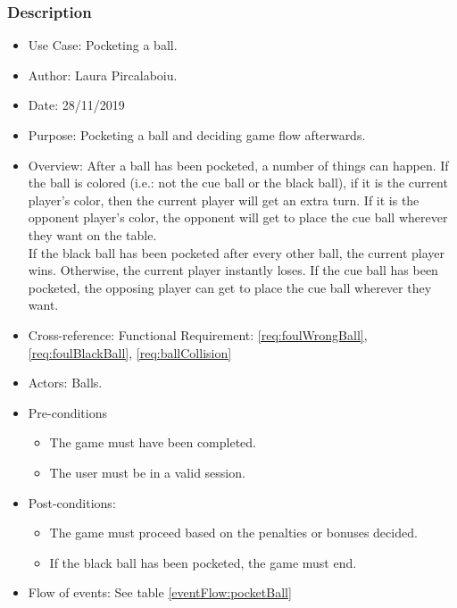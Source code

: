 \documentclass[10pt]{article}
\begin{document}
	\subsubsection{Description}
		\begin{itemize}
			\item{Use Case:} Pocketing a ball.
			\item{Author:} Laura Pircalaboiu.
			\item{Date:} 28/11/2019
			\item{Purpose:} Pocketing a ball and deciding game flow afterwards.
			\item{Overview:} After a ball has been pocketed, a number of things can happen. If the ball is colored (i.e.: not the cue ball or the black ball), if it is the current player's color, then the current player will get an extra turn. If it is the opponent player's color, the opponent will get to place the cue ball wherever they want on the table.\\
			If the black ball has been pocketed after every other ball, the current player wins. Otherwise, the current player instantly loses.
			If the cue ball has been pocketed, the opposing player can get to place the cue ball wherever they want.
			\item{Cross-reference:} Functional Requirement: \ref{req:foulWrongBall}, \ref{req:foulBlackBall}, \ref{req:ballCollision}
			\item{Actors:} Balls.
			\item{Pre-conditions} 
				\begin{itemize}
					\item The game must have been completed.
					\item The user must be in a valid session.
				\end{itemize}
			\item{Post-conditions:}
				\begin{itemize}
					\item The game must proceed based on the penalties or bonuses decided.
					\item If the black ball has been pocketed, the game must end.
				\end{itemize}
			\item{Flow of events:} See table \ref{eventFlow:pocketBall}
		\end{itemize}
\end{document}

